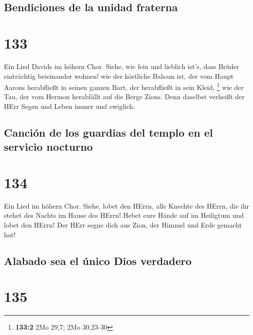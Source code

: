 \hypertarget{bendiciones-de-la-unidad-fraterna}{%
\subsection{Bendiciones de la unidad
fraterna}\label{bendiciones-de-la-unidad-fraterna}}

\hypertarget{section-132}{%
\section{133}\label{section-132}}

 Ein Lied Davids im höhern Chor. Siehe, wie fein und
lieblich ist's, dass Brüder einträchtig beieinander wohnen!
 wie der köstliche Balsam ist, der vom Haupt Aarons
herabfließt in seinen ganzen Bart, der herabfließt in sein Kleid,
\footnote{\textbf{133:2} 2Mo 29,7; 2Mo 30,23-30}  wie der
Tau, der vom Hermon herabfällt auf die Berge Zions. Denn daselbst
verheißt der HErr Segen und Leben immer und ewiglich.

\hypertarget{canciuxf3n-de-los-guardias-del-templo-en-el-servicio-nocturno}{%
\subsection{Canción de los guardias del templo en el servicio
nocturno}\label{canciuxf3n-de-los-guardias-del-templo-en-el-servicio-nocturno}}

\hypertarget{section-133}{%
\section{134}\label{section-133}}

 Ein Lied im höhern Chor. Siehe, lobet den HErrn, alle
Knechte des HErrn, die ihr stehet des Nachts im Hause des HErrn!
 Hebet eure Hände auf im Heiligtum und lobet den HErrn!
 Der HErr segne dich aus Zion, der Himmel und Erde gemacht
hat!

\hypertarget{alabado-sea-el-uxfanico-dios-verdadero}{%
\subsection{Alabado sea el único Dios
verdadero}\label{alabado-sea-el-uxfanico-dios-verdadero}}

\hypertarget{section-134}{%
\section{135}\label{section-134}}

